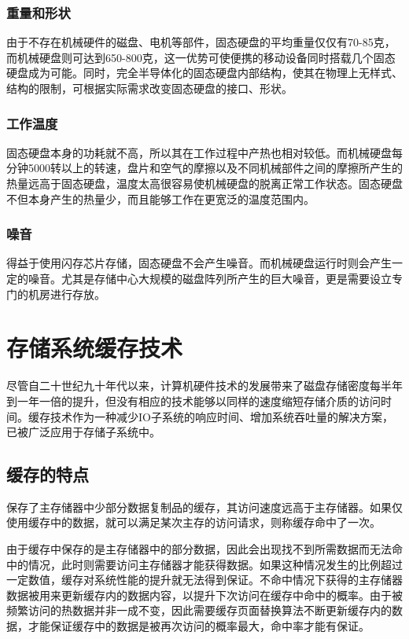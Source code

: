 \subsubsection{重量和形状}
由于不存在机械硬件的磁盘、电机等部件，固态硬盘的平均重量仅仅有70-85克，而机械硬盘则可达到650-800克，这一优势可使便携的移动设备同时搭载几个固态硬盘成为可能。同时，完全半导体化的固态硬盘内部结构，使其在物理上无样式、结构的限制，可根据实际需求改变固态硬盘的接口、形状。

\subsubsection{工作温度}
固态硬盘本身的功耗就不高，所以其在工作过程中产热也相对较低。而机械硬盘每分钟5000转以上的转速，盘片和空气的摩擦以及不同机械部件之间的摩擦所产生的热量远高于固态硬盘，温度太高很容易使机械硬盘的脱离正常工作状态。固态硬盘不但本身产生的热量少，而且能够工作在更宽泛的温度范围内。

\subsubsection{噪音}
得益于使用闪存芯片存储，固态硬盘不会产生噪音。而机械硬盘运行时则会产生一定的噪音。尤其是存储中心大规模的磁盘阵列所产生的巨大噪音，更是需要设立专门的机房进行存放。

\section{存储系统缓存技术}
\label{sec:storage_cache_tech}

尽管自二十世纪九十年代以来，计算机硬件技术的发展带来了磁盘存储密度每半年到一年一倍的提升，但没有相应的技术能够以同样的速度缩短存储介质的访问时间。缓存技术\cite{cache2011}作为一种减少IO子系统的响应时间、增加系统吞吐量的解决方案，已被广泛应用于存储子系统中。

\subsection{缓存的特点}
保存了主存储器中少部分数据复制品的缓存，其访问速度远高于主存储器。如果仅使用缓存中的数据，就可以满足某次主存的访问请求，则称缓存命中了一次。

由于缓存中保存的是主存储器中的部分数据，因此会出现找不到所需数据而无法命中的情况，此时则需要访问主存储器才能获得数据。如果这种情况发生的比例超过一定数值，缓存对系统性能的提升就无法得到保证。不命中情况下获得的主存储器数据被用来更新缓存内的数据内容，以提升下次访问在缓存中命中的概率。由于被频繁访问的热数据并非一成不变，因此需要缓存页面替换算法不断更新缓存内的数据，才能保证缓存中的数据是被再次访问的概率最大，命中率才能有保证。

